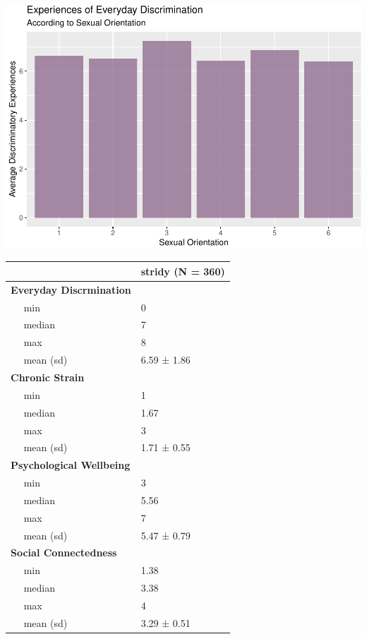 \documentclass[
  english,
  man,floatsintext]{apa6}
\begin{document}
\includegraphics{prep_script_files/figure-latex/mean plot-1.pdf}

\begin{longtable}[]{@{}ll@{}}
\toprule
& stridy (N = 360)\tabularnewline
\midrule
\endhead
\textbf{Everyday Discrmination} & ~~\tabularnewline
~~ min & 0\tabularnewline
~~ median & 7\tabularnewline
~~ max & 8\tabularnewline
~~ mean (sd) & 6.59 ± 1.86\tabularnewline
\textbf{Chronic Strain} & ~~\tabularnewline
~~ min & 1\tabularnewline
~~ median & 1.67\tabularnewline
~~ max & 3\tabularnewline
~~ mean (sd) & 1.71 ± 0.55\tabularnewline
\textbf{Psychological Wellbeing} & ~~\tabularnewline
~~ min & 3\tabularnewline
~~ median & 5.56\tabularnewline
~~ max & 7\tabularnewline
~~ mean (sd) & 5.47 ± 0.79\tabularnewline
\textbf{Social Connectedness} & ~~\tabularnewline
~~ min & 1.38\tabularnewline
~~ median & 3.38\tabularnewline
~~ max & 4\tabularnewline
~~ mean (sd) & 3.29 ± 0.51\tabularnewline
\bottomrule
\end{longtable}
\end{document}
